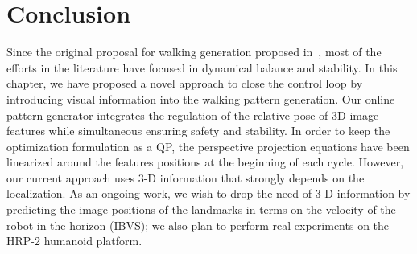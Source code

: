 \section{Conclusion}
\label{sec:conclusions}
Since the original proposal for walking generation proposed in~\cite{Kajita2003}, most of the efforts in the literature have focused in dynamical balance and stability. In this chapter, we have proposed a novel approach to close the control loop by introducing visual information into the walking pattern generation. Our online pattern generator integrates the regulation of the relative pose of 3D image features while simultaneous ensuring safety and stability. In order to keep the optimization formulation as a QP, the perspective projection equations have been linearized around the features positions at the beginning of each cycle. However, our current approach uses 3-D information that strongly depends on the localization. As an ongoing work, we wish to drop the need of 3-D information by predicting the image positions of the landmarks in terms on the velocity of the robot in the horizon (IBVS); we also plan to perform real experiments on the HRP-2 humanoid platform.
